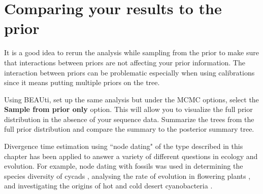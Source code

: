 \documentclass[11pt]{article}
\theoremstyle{plain}%
\theoremstyle{definition}
\theoremstyle{remark}
\begin{document}
\newpage

\section{Comparing your results to the prior}

It is a good idea to rerun the analysis while sampling from the prior to make sure
that interactions between priors are not affecting your prior information. The
interaction between priors can be problematic especially when using calibrations
since it means putting multiple priors on the tree.

Using BEAUti, set up the same analysis but under the MCMC options, select the {\bf Sample from prior only} option. This will allow you to visualize the full prior distribution in the absence of your sequence data. Summarize the trees from the full prior
distribution and compare the summary to the posterior summary tree.

Divergence time estimation using ``node dating" of the type described in this
chapter has been applied to answer a variety of different questions in ecology
and evolution. For example, node dating with fossils was used in determining
the species diversity of cycads \cite{nagalingum2011recent}, analysing the rate of
evolution in flowering plants \cite{smith2008rates}, and investigating the
origins of hot and cold desert cyanobacteria \cite{bahl2011ancient}.

 









\end{document}
